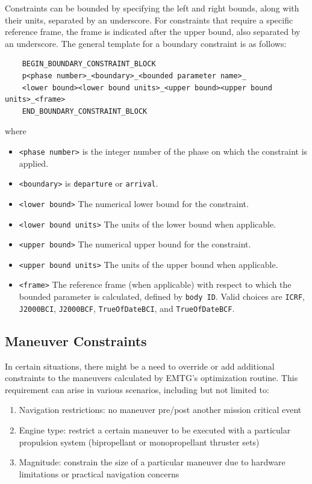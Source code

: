 \documentclass[11pt]{article}
\begin{document}
\noindent Constraints can be bounded by specifying the left and right bounds, along with their units, separated by an underscore. For constraints that require a specific reference frame, the frame is indicated after the upper bound, also separated by an underscore. The general template for a boundary constraint is as follows:

\begin{verbatim}
    BEGIN_BOUNDARY_CONSTRAINT_BLOCK
    p<phase number>_<boundary>_<bounded parameter name>_
    <lower bound><lower bound units>_<upper bound><upper bound units>_<frame>
    END_BOUNDARY_CONSTRAINT_BLOCK
\end{verbatim}
    
where

\begin{itemize}
    \item \texttt{<phase number>} is the integer number of the phase on which the constraint is applied.
    \item \texttt{<boundary>} is \texttt{departure} or \texttt{arrival}.
    \item \texttt{<lower bound>} The numerical lower bound for the constraint.
    \item \texttt{<lower bound units>} The units of the lower bound when applicable. 
    \item \texttt{<upper bound>} The numerical upper bound for the constraint.
    \item \texttt{<upper bound units>} The units of the upper bound when applicable.
    \item \texttt{<frame>} The reference frame (when applicable) with respect to which the bounded parameter is calculated, defined by \texttt{body ID}. Valid choices are \texttt{ICRF}, \texttt{J2000BCI}, \texttt{J2000BCF}, \texttt{TrueOfDateBCI}, and \texttt{TrueOfDateBCF}.
\end{itemize}

\subsection{Maneuver Constraints}
\label{sec:maneuver_constraints}

In certain situations, there might be a need to override or add additional constraints to the maneuvers calculated by \ac{EMTG}'s optimization routine. This requirement can arise in various scenarios, including but not limited to:
\begin{enumerate}
    \item Navigation restrictions: no maneuver pre/post another mission critical event
    \item Engine type: restrict a certain maneuver to be executed with a particular propulsion system (bipropellant or monopropellant thruster sets)
    \item Magnitude: constrain the size of a particular maneuver due to hardware limitations or practical navigation concerns
\end{enumerate}
\end{document}
